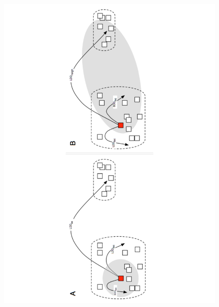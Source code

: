 \documentclass[a4paper, 12pt]{article}
\begin{document}
\begin{linenumbers}
\newpage 
\begin{figure}[htbp]
\centerline{\includegraphics[height=25cm]{Fig2.pdf}}
%
\end{figure}


\end{linenumbers}
\end{document}
